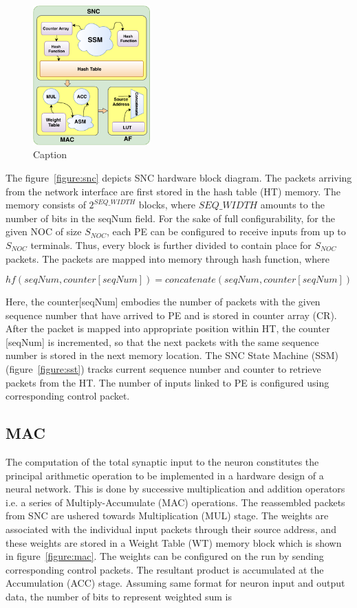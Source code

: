 \begin{figure}
    \centering
    \includegraphics[width =0.4\textwidth]{Figures/overall2.pdf}
    \caption{Caption}
    \label{fig:my_label}
\end{figure}


The figure~\ref{figure:snc} depicts SNC hardware block diagram. The packets arriving from the network
interface are first stored in the hash table (HT) memory. The memory consists of $2^{SEQ\_WIDTH}$ blocks,
where $SEQ\_WIDTH$ amounts to the number of bits in the seqNum field. For the sake of full configurability, for the given NOC of size $S_{NOC}$, each PE can be configured to receive inputs
from up to $S_{NOC}$ terminals. Thus, every block is further divided to contain place for $S_{NOC}$ packets. The packets are mapped into memory through hash function, where

\begin{equation}
hf (seqNum, counter[seqNum]) = concatenate(seqNum, counter[seqNum])
\label{equation:hf}
\end{equation}

Here, the counter[seqNum] embodies the number of packets with the given sequence number that have
arrived to PE and is stored in counter array (CR). After the packet is mapped into appropriate position
within HT, the counter [seqNum] is incremented, so that the next packets with the same sequence
number is stored in the next memory location. The SNC State Machine (SSM) (figure~\ref{figure:sst})
tracks current sequence number and counter to retrieve packets from the HT. The number of inputs
linked to PE is configured using corresponding control packet.

\subsection{MAC}
The computation of the total synaptic input to the neuron constitutes the principal arithmetic operation to be implemented in a hardware design of a neural network. This is done by successive multiplication and addition operators i.e. a series of Multiply-Accumulate (MAC) operations. The reassembled packets from SNC are ushered towards Multiplication (MUL) stage. The weights are associated with the individual input packets through their source address, and these weights are stored in a Weight Table (WT) memory block which is shown in figure~\ref {figure:mac}. The weights can be configured on the run by sending corresponding control packets. The resultant product is accumulated at the Accumulation (ACC) stage. Assuming same format for neuron input and output data, the number of bits to represent weighted sum is


